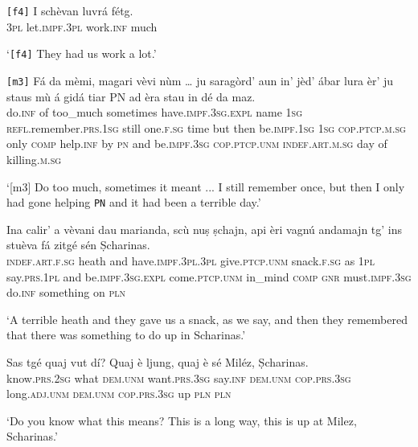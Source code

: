 \begin{linenumbers}
	\gll \texttt{[f4]} I schèvan luvrá fétg.\\
{}	\textsc{3pl} let.\textsc{impf.3pl} work.\textsc{inf} much\\
\end{linenumbers}
\medskip
\glt `\texttt{[f4]} They had us work a lot.'
\medskip

\begin{linenumbers}
	\gll  \texttt{[m3]} Fá da mèmi, magari vèvi nùm … ju saragòrd’ aun in' jèd’ ábar lura èr’ ju staus mù á gidá tiar PN ad èra stau in dé da maz.\\
{}	do.\textsc{inf} of too\_much sometimes have.\textsc{impf.3sg.expl} name {} \textsc{1sg} \textsc{refl}.remember.\textsc{prs.1sg} still one.\textsc{f.sg} time but then be.\textsc{impf.1sg} \textsc{1sg} \textsc{cop.ptcp.m.sg} only \textsc{comp} help.\textsc{inf} by \textsc{pn} and be.\textsc{impf.3sg} \textsc{cop.ptcp.unm} \textsc{indef.art.m.sg} day of killing.\textsc{m.sg}\\
\end{linenumbers}
\medskip
\glt `[m3] Do too much, sometimes it meant ... I still remember once, but then I only had gone helping \texttt{PN} and it had been a terrible day.'
\medskip

\begin{linenumbers}
	\gll Ina calir’ a vèvani dau marianda, scù nuṣ ṣchajn, api èri vagnú andamajn tg’ ins stuèva fá zitgé sén Ṣcharinas.   \\
	\textsc{indef.art.f.sg} heath and  have.\textsc{impf.3pl.3pl} give.\textsc{ptcp.unm} snack.\textsc{f.sg} as \textsc{1pl} say.\textsc{prs.1pl} and be.\textsc{impf.3sg.expl} come.\textsc{ptcp.unm} in\_mind \textsc{comp} \textsc{gnr} must.\textsc{impf.3sg} do.\textsc{inf} something on \textsc{pln} \\
\end{linenumbers}
\medskip
\glt `A terrible heath and they gave us a snack, as we say, and then they remembered that there was something to do up in Scharinas.'
\medskip

\begin{linenumbers}
	\gll Sas tgé quaj vut dí? Quaj è ljung, quaj è sé Miléz, Ṣcharinas.   \\
	know.\textsc{prs.2sg} what \textsc{dem.unm} want.\textsc{prs.3sg} say.\textsc{inf} \textsc{dem.unm} \textsc{cop.prs.3sg} long.\textsc{adj.unm} \textsc{dem.unm} \textsc{cop.prs.3sg} up \textsc{pln} \textsc{pln}\\
\end{linenumbers}
\medskip
\glt `Do you know what this means? This is a long way, this is up at Milez, Scharinas.'
\medskip

